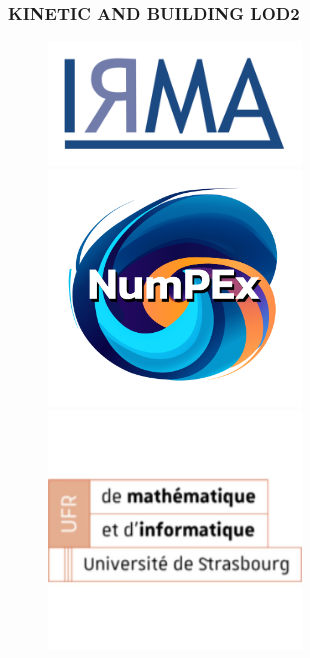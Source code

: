 \documentclass[10pt]{beamer}
\begin{document}
\begin{frame}
\frametitle{KINETIC AND BUILDING LOD2}
\begin{figure}
    \begin{minipage}{0.33\textwidth}
        \centering
        \includegraphics[width=0.6\textwidth]{../image/logo_irma.png}
    \end{minipage}%
    \begin{minipage}{0.33\textwidth}
        \centering
        \includegraphics[width=0.6\textwidth]{../image/logo-numpex-web-2.png}
    \end{minipage}%
    \begin{minipage}{0.33\textwidth}
        \centering
        \includegraphics[width=0.6\textwidth]{../image/logo-ufr-mathinfo-unistra-1.jpg}
    \end{minipage}
    

\end{figure}
\end{frame}
\end{document}
